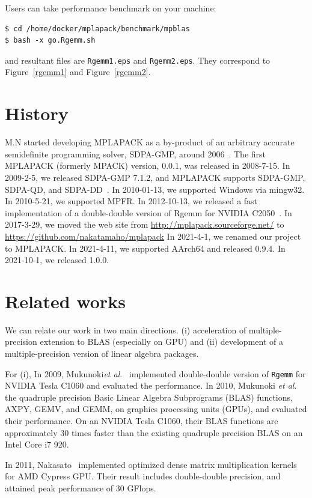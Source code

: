 \documentclass[12pt]{article}
\newcommand{\etal}{\textit{et al}.}
\begin{document}
Users can take performance benchmark on your machine:
\begin{verbatim}
$ cd /home/docker/mplapack/benchmark/mpblas
$ bash -x go.Rgemm.sh
\end{verbatim}
and resultant files are {\tt Rgemm1.eps}  and {\tt Rgemm2.eps}. They correspond to Figure~\ref{rgemm1} and Figure~\ref{rgemm2}.

\section{History}
\label{sec:history}
M.N started developing MPLAPACK as a by-product of an arbitrary accurate semidefinite programming solver, SDPA-GMP, around 2006~\cite{JCP2008}. The first MPLAPACK (formerly MPACK) version, 0.0.1, was released in 2008-7-15. In 2009-2-5, we released SDPA-GMP 7.1.2, and MPLAPACK supports SDPA-GMP, SDPA-QD, and SDPA-DD~\cite{SDPA-GMP,sdpa-gmpgithub,sdpa-qdgithub,sdpa-ddgithub}. In 2010-01-13, we supported Windows via mingw32. In 2010-5-21, we supported MPFR. In 2012-10-13, we released a fast implementation of a double-double version of Rgemm for NVIDIA C2050~\cite{6424545,6495966}. In 2017-3-29, we moved the web site from \url{http://mplapack.sourceforge.net/} to \url{https://github.com/nakatamaho/mplapack} In 2021-4-1, we renamed our project to MPLAPACK. In 2021-4-11, we supported AArch64 and released 0.9.4. In 2021-10-1, we released 1.0.0.

\section{Related works}
\label{sec:relatedworks}
We can relate our work in two main directions. (i) acceleration of multiple-precision extension to BLAS (especially on GPU) and (ii) development of a multiple-precision version of linear algebra packages.

For (i), In 2009, Mukunoki\etal{}~\cite{HPC-137_1} implemented double-double version of {\tt Rgemm} for NVIDIA Tesla C1060 and evaluated the performance. In 2010, Mukunoki \etal{}~\cite{10.1007/978-3-642-28151-8_25} the quadruple precision Basic Linear Algebra Subprograms (BLAS) functions, AXPY, GEMV, and GEMM, on graphics processing units (GPUs), and evaluated their performance. On an NVIDIA Tesla C1060, their BLAS functions are approximately 30 times faster than the existing quadruple precision BLAS on an Intel Core i7 920.

In 2011, Nakasato~\cite{Nakasato2011AFG} implemented optimized dense matrix multiplication kernels for AMD Cypress GPU. Their result includes double-double precision, and attained peak performance of 30 GFlops.
\end{document}
